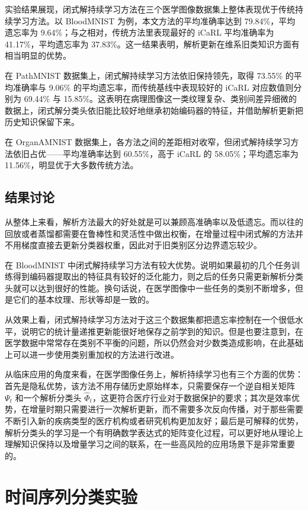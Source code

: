 实验结果展现，闭式解持续学习方法在三个医学图像数据集上整体表现优于传统持续学习方法。以 BloodMNIST 为例，本文方法的平均准确率达到 79.84\%，平均遗忘率为 9.64\%；与之相对，传统方法里表现最好的 iCaRL 平均准确率为 41.17\%，平均遗忘率为 37.83\%。这一结果表明，解析更新在维系旧类知识方面有相当明显的优势。

在 PathMNIST 数据集上，闭式解持续学习方法依旧保持领先，取得 73.55\% 的平均准确率与 9.06\% 的平均遗忘率，而传统基线中表现较好的 iCaRL 对应数值则分别为 69.44\% 与 15.85\%。这表明在病理图像这一类纹理复杂、类别间差异细微的数据上，闭式解分类头依旧能比较好地继承初始编码器的特征，并借助解析更新把历史知识保留下来。

在 OrganAMNIST 数据集上，各方法之间的差距相对收窄，但闭式解持续学习方法依旧占优——平均准确率达到 60.55\%，高于 iCaRL 的 58.05\%；平均遗忘率为 11.56\%，明显优于大多数传统方法。

\subsection{结果讨论}

从整体上来看，解析方法最大的好处就是可以兼顾高准确率以及低遗忘。而以往的回放或者蒸馏都需要在鲁棒性和灵活性中做出权衡，在增量过程中闭式解的方法并不用梯度直接去更新分类器权重，因此对于旧类别区分边界遗忘较少。

在 BloodMNIST 中闭式解持续学习方法有较大优势。说明如果最初的几个任务训练得到编码器提取出的特征具有较好的泛化能力，则之后的任务只需更新解析分类头就可以达到很好的性能。换句话说，在医学图像中一些任务的类别不断增多，但是它们的基本纹理、形状等却是一致的。

从效果上看，闭式解持续学习方法对于这三个数据集都把遗忘率控制在一个很低水平，说明它的统计量递推更新能很好地保存之前学到的知识。但是也要注意到，在医学数据中常常存在类别不平衡的问题，所以仍然会对少数类造成影响，在此基础上可以进一步使用类别重加权的方法进行改进。

从临床应用的角度来看，在医学图像任务上，解析持续学习也有三个方面的优势：首先是隐私优势，该方法不用存储历史原始样本，只需要保存一个逆自相关矩阵 $\Psi_t$ 和一个解析分类头 $\widehat{\Phi}_t$，这更符合医疗行业对于数据保护的要求；其次是效率优势，在增量时期只需要进行一次解析更新，而不需要多次反向传播，对于那些需要不断引入新的疾病类型的医疗机构或者研究机构更加友好；最后是可解释的优势，解析分类头的学习是一个有明确数学表达式的矩阵变化过程，可以更好地从理论上理解知识保持以及增量学习之间的联系，在一些高风险的应用场景下是非常重要的。

\section{时间序列分类实验}

